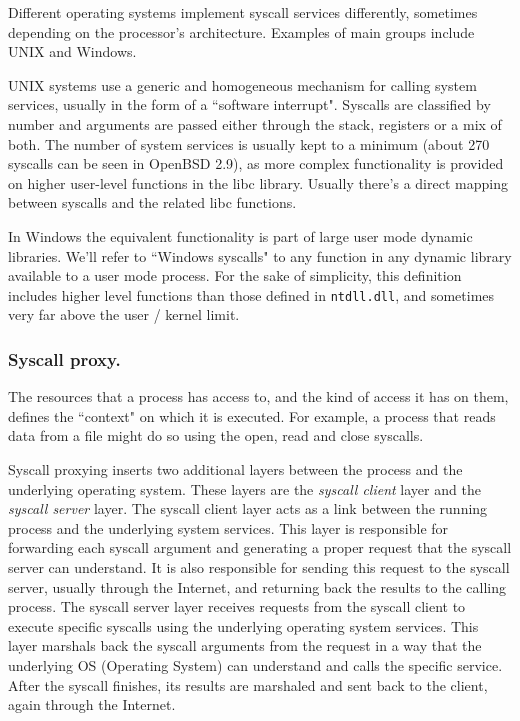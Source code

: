 \documentclass{llncs}
\begin{document}
Different operating systems implement syscall services differently, sometimes depending on the processor's architecture.
Examples of main groups include UNIX and Windows.

UNIX systems use a generic and homogeneous mechanism for calling system services, usually in the form of 
a ``software interrupt". Syscalls are classified by number and arguments are passed either through the
stack, registers or a mix of both. The number of system services is usually kept to a minimum (about 270 syscalls
can be seen in OpenBSD 2.9), as more complex functionality is provided on higher user-level functions in the libc
library. Usually there's a direct mapping between syscalls and the related libc functions.

In Windows the equivalent functionality is part of large user mode dynamic libraries. We'll refer
to ``Windows syscalls" to any function in any dynamic library available to a user mode process. 
For the sake of simplicity,
this definition includes higher level functions than those defined in {\tt ntdll.dll}, and sometimes very far above the
user / kernel limit.

\subsubsection{Syscall proxy.}

The resources that a process has access to, and the kind of access it has on them, defines the
``context" on which it is executed.
For example, a process that reads data from a file might do so using the open, read and close syscalls.

Syscall proxying inserts two additional layers between the process and the underlying operating system. These layers
are the \emph{syscall client} layer and the \emph{syscall server} layer.
The syscall client layer acts as a link between the running process and the underlying system services. 
This layer is responsible for forwarding each syscall argument and generating a proper request that the syscall server can
understand. It is also responsible for sending this request to the syscall server, usually through the Internet,
 and returning back the results to the calling process.
The syscall server layer receives requests from the syscall client to execute specific syscalls using the underlying
operating system services. This layer marshals back the syscall arguments from the request in a way that the underlying
OS (Operating System) can understand and calls the specific service. After the syscall finishes, its results are marshaled and sent back to
the client, again through the Internet.
\end{document}
